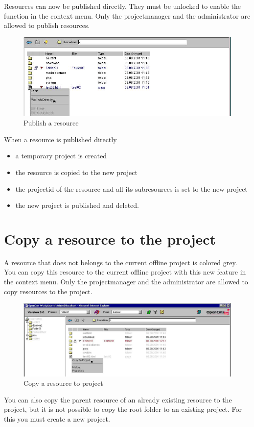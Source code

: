 Resources can now be published directly. They must be unlocked to
enable the function in the context menu. Only the projectmanager
and the administrator are allowed to publish resources.

\begin{figure}[hbt]
\begin{center}
\includegraphics[width=\sgw]
                   {pics/newProject/publish03}
\caption[Publish a resource]
           {Publish a resource}
\label{publishres}
\end{center}
\end{figure}

When a resource is published directly

\begin{itemize}
\item a temporary project is created
\item the resource is copied to the new project
\item the projectid of the resource and all its subresources is set to the new project
\item the new project is published and deleted.
\end{itemize}


\newpage
\section{Copy a resource to the project}

A resource that does not belongs to the current offline project is
colored grey. You can copy this resource to the current offline
project with this new feature in the context menu. Only the
projectmanager and the administrator are allowed to copy resources
to the project.

\begin{figure}[hbt]
\begin{center}
\includegraphics[width=\sgw]
                   {pics/newProject/copyPro02}
\caption[Copy a resource to project]
           {Copy a resource to project}
\label{copytoproject}
\end{center}
\end{figure}

You can also copy the parent resource of an already existing
resource to the project, but it is not possible to copy the root
folder to an existing project. For this you must create a new
project.
